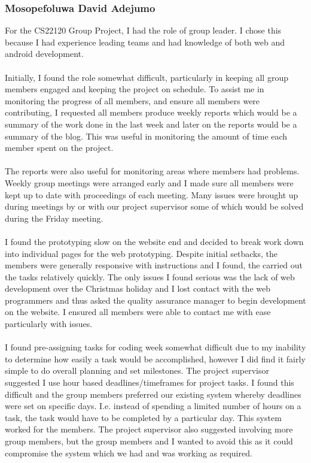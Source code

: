 \documentclass[12pt, portrait]{article}
\begin{document}
\subsubsection{Mosopefoluwa David Adejumo}
For the CS22120 Group Project, I had the role of group leader. I chose this because I had experience leading teams and had knowledge of both web and android development.~\\\\
Initially, I found the role somewhat difficult, particularly in keeping all group members engaged and keeping the project on schedule. To assist me in monitoring the progress of all members, and ensure all members were contributing, I requested all members produce weekly reports which would be a summary of the work done in the last week and later on the reports would be a summary of the blog. This was useful in monitoring the amount of time each member spent on the project. ~\\\\ 
The reports were also useful for monitoring areas where members had problems. Weekly group meetings were arranged early and I made sure all members were kept up to date with proceedings of each meeting. Many issues were brought up during meetings by or with our project supervisor some of which would be solved during the Friday meeting. ~\\\\
I found the prototyping slow on the website end and decided to break work down into individual pages for the web prototyping. Despite initial setbacks, the members were generally responsive with instructions and I found, the carried out the tasks relatively quickly. The only issues I found serious was the lack of web development over the Christmas holiday and I lost contact with the web programmers and thus asked the quality assurance manager to begin development on the website. I ensured all members were able to contact me with ease particularly with issues. ~\\\\ 
I found pre-assigning tasks for coding week somewhat difficult due to my inability to determine how easily a task would be accomplished, however I did find it fairly simple to do overall planning and set milestones. The project supervisor suggested I use hour based deadlines/timeframes for project tasks. I found this difficult and the group members preferred our existing system whereby deadlines were set on specific days. I.e. instead of spending a limited number of hours on a task, the task would have to be completed by a particular day. This system worked for the members. The project supervisor also suggested involving more group members, but the group members and I wanted to avoid this as it could compromise the system which we had and was working as required. ~\\\\
\end{document}
